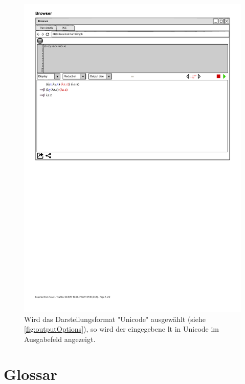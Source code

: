 \documentclass[parskip=full,11pt,twoside]{scrartcl}
\begin{document}
\begin{figure}[H]
	\centering
	\includegraphics[width=\textwidth]{img/Unicode_Darstellunsgmodus}
	\caption{\label{fig:unicode}Wird das Darstellungsformat "Unicode" ausgewählt (siehe \cref{fig:outputOptions}), so wird der eingegebene \gls{lt} in Unicode im Ausgabefeld angezeigt.}
\end{figure}



\section{Glossar}

\printglossaries
\end{document}
